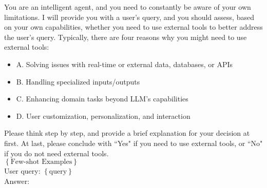 \begin{tcolorbox}[colback=yellow!20, colframe=black, title=Chain of Thought Prompting.]
You are an intelligent agent, and you need to constantly be aware of your own limitations. I will provide you with a user's query, and you should assess, based on your own capabilities, whether you need to use external tools to better address the user's query. Typically, there are four reasons why you might need to use external tools:

\begin{itemize}
    \item A. Solving issues with real-time or external data, databases, or APIs
    \item B. Handling specialized inputs/outputs
    \item C. Enhancing domain tasks beyond LLM's capabilities
    \item D. User customization, personalization, and interaction
\end{itemize}

Please think step by step, and provide a brief explanation for your decision at first. At last, please conclude with ``Yes" if you need to use external tools, or ``No" if you do not need external tools. \\

$\left\{ \text{Few-shot Examples} \right\}$\\

User query: $\left\{ \text{query} \right\}$\\

Answer: 
\end{tcolorbox}


